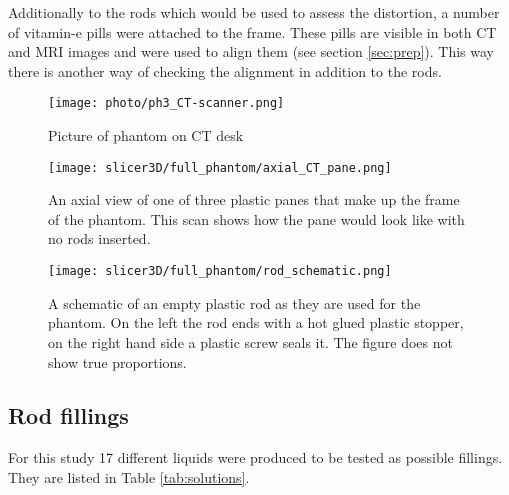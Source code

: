 Additionally to the rods which would be used to assess the distortion, a number of vitamin-e pills were attached to the frame.
These pills are visible in both CT and MRI images and were used to align them (see section \ref{sec:prep}).
This way there is another way of checking the alignment in addition to the rods.


\begin{figure}[!bp]
\centering
\texttt{[image: photo/ph3\_CT-scanner.png]}
\caption{Picture of phantom on CT desk}
\label{fig:photo_ph3}
\end{figure}

\begin{figure}[!tbp]
\centering
\texttt{[image: slicer3D/full\_phantom/axial\_CT\_pane.png]}
\caption{An axial view of one of three plastic panes that make up the frame of the phantom. This scan shows how the pane would look like with no rods inserted.}
\label{fig:axial_CT_pane}
\end{figure}

\begin{figure}[!tbp]
\centering
\texttt{[image: slicer3D/full\_phantom/rod\_schematic.png]}
\caption{A schematic of an empty plastic rod as they are used for the phantom. On the left the rod ends with a hot glued plastic stopper, on the right hand side a plastic screw seals it. The figure does not show true proportions.}
\label{fig:rod_schematic}
\end{figure}

\clearpage

\subsection{Rod fillings}

For this study 17 different liquids were produced to be tested as possible fillings.
They are listed in Table \ref{tab:solutions}.


